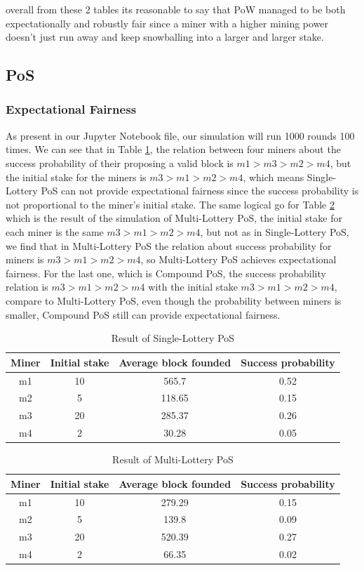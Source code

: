 \documentclass{article}
\begin{document}
overall from these 2 tables its reasonable to say that \gls{PoW} managed to be both expectationally and robustly fair since a miner with a higher mining power doesn't just run away and keep snowballing into a larger and larger stake.

\subsection{\gls{PoS}}
\subsubsection{Expectational Fairness }
As present in our Jupyter Notebook file, our simulation will run 1000 rounds 100 times. We can see that in Table \ref{table:sl}, the relation between four miners about the success probability of their proposing a valid block is $m1>m3>m2>m4$, but the initial stake for the miners is $m3>m1>m2>m4$, which means Single-Lottery \gls{PoS} can not provide expectational fairness since the success probability is not proportional to the miner's initial stake. The same logical go for Table \ref{table:ml} which is the result of the simulation of Multi-Lottery \gls{PoS}, the initial stake for each miner is the same $m3>m1>m2>m4$, but not as in Single-Lottery \gls{PoS}, we find that in Multi-Lottery \gls{PoS} the relation about success probability for miners is $m3>m1>m2>m4$, so Multi-Lottery \gls{PoS} achieves expectational fairness. For the last one, which is Compound \gls{PoS}, the success probability relation is $m3>m1>m2>m4$ with the initial stake $m3>m1>m2>m4$, compare to Multi-Lottery \gls{PoS}, even though the probability between miners is smaller, Compound \gls{PoS} still can provide expectational fairness.

\begin{table}[h!]
\centering
\begin{tabular}{||c c c c||} 
 \hline
 Miner  & Initial stake & Average block founded & Success probability\\ [0.5ex] 
 \hline\hline
 m1 & 10 & 565.7 & 0.52 \\ 
 m2 & 5  & 118.65 & 0.15\\
 m3 & 20 & 285.37 & 0.26\\
 m4 & 2  & 30.28  & 0.05 \\[1ex] 
 \hline
\end{tabular}
\caption{Result of Single-Lottery \gls{PoS}}
\label{table:sl}
\end{table}

\begin{table}[h!]
\centering
\begin{tabular}{||c c c c||} 
 \hline
 Miner  & Initial stake & Average block founded & Success probability\\ [0.5ex] 
 \hline\hline
 m1 & 10  & 279.29 & 0.15\\ 
 m2 & 5  & 139.8 & 0.09\\
 m3 & 20 & 520.39  & 0.27\\
 m4 & 2  & 66.35  & 0.02\\ [1ex] 
 \hline
\end{tabular}
\caption{Result of Multi-Lottery \gls{PoS}}
\label{table:ml}
\end{table}
\end{document}
